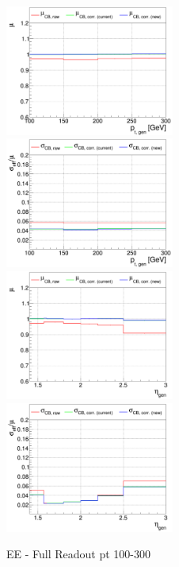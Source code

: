 \begin{figure}
\includegraphics[width=0.495\textwidth]{./plots_pdf/ECAL_plots/plotsPU/EE/FULL/pdf/GENPT/EEFULL_GENPT_0100_0300_MuOverBins.pdf}
\includegraphics[width=0.495\textwidth]{./plots_pdf/ECAL_plots/plotsPU/EE/FULL/pdf/GENPT/EEFULL_GENPT_0100_0300_EffSigmaOverBins.pdf}
\includegraphics[width=0.495\textwidth]{./plots_pdf/ECAL_plots/plotsPU/EE/FULL/pdf/GENETA/EEFULL_GENETA_0100_0300_MuOverBins.pdf}
\includegraphics[width=0.495\textwidth]{./plots_pdf/ECAL_plots/plotsPU/EE/FULL/pdf/GENETA/EEFULL_GENETA_0100_0300_EffSigmaOverBins.pdf}
\caption{EE - Full Readout pt 100-300}
\end{figure}




